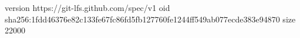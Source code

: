 version https://git-lfs.github.com/spec/v1
oid sha256:1fdd46376e82c133fe67fc86fd5fb127760fe1244ff549ab077ecde383e94870
size 22000
